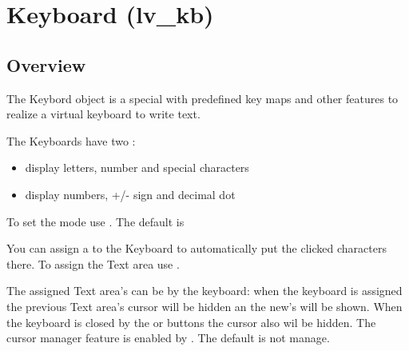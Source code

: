 \documentclass[letterpaper,10pt,english]{sphinxmanual}
\begin{document}
\section{Keyboard (lv\_kb)}
\label{\detokenize{object-types/kb:keyboard-lv-kb}}\label{\detokenize{object-types/kb::doc}}

\subsection{Overview}
\label{\detokenize{object-types/kb:overview}}
The Keybord object is a special {\hyperref[\detokenize{object-types/btnm::doc}]{}} with predefined key maps and other features to realize a virtual keyboard to write text.

The Keyboards have two :
\begin{itemize}
\item {} 
 display letters, number and special characters

\item {} 
 display numbers, +/- sign and decimal dot

\end{itemize}

To set the mode use . The default is  

You can assign a {\hyperref[\detokenize{object-types/ta::doc}]{}} to the Keyboard to automatically put the clicked characters there.
To assign the Text area use .

The assigned Text area’s  can be  by the keyboard: when the keyboard is assigned the previous Text area’s cursor will be hidden an the new’s will be shown.
When the keyboard is closed by the  or  buttons the cursor also wil be hidden. The cursor manager feature is enabled by . The default is not manage.
\end{document}

